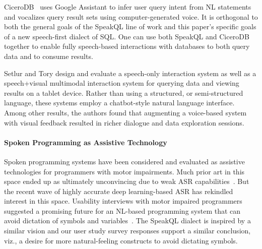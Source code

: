 CiceroDB~\cite{10.14778/3415478.3415496} uses Google Assistant to infer user query intent from NL statements and vocalizes query result sets using computer-generated voice. 
It is orthogonal to both the general goals of the SpeakQL line of work and this paper's specific goals of a new speech-first dialect of SQL. 
One can use both SpeakQL and CiceroDB together to enable fully speech-based interactions with databases to both query data and to consume results.

Setlur and Tory \cite{10.1145/3491102.3501972} design and evaluate a speech-only interaction system as well as a speech+visual multimodal interaction system for querying data and viewing results on a tablet device. Rather than using a structured, or semi-structured language, these systems employ a chatbot-style natural language interface. Among other results, the authors found that augmenting a voice-based system with visual feedback resulted in richer dialogue and data exploration sessions.

\paragraph{\textbf{Spoken Programming as Assistive Technology}}
Spoken programming systems have been considered and evaluated as assistive technologies for programmers with motor impairments. 
Much prior art in this space ended up as ultimately unconvincing due to weak ASR capabilities~\cite{1698772}. 
But the recent wave of highly accurate deep learning-based ASR has rekindled interest in this space. 
Usability interviews with motor impaired programmers suggested a promising future for an NL-based programming system that can avoid dictation of symbols and variables~\cite{10.1145/3517428.3550392}. 
The SpeakQL dialect is inspired by a similar vision and our user study survey responses support a similar conclusion, viz., a desire for more natural-feeling constructs to avoid dictating symbols.








